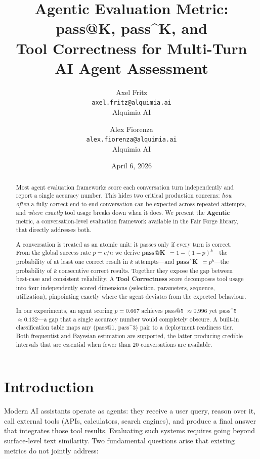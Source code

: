 \documentclass[11pt,a4paper]{article}
\title{\textbf{Agentic Evaluation Metric: pass@K, pass\^{}K, and\\
Tool Correctness for Multi-Turn AI Agent Assessment}}
\author{
    Axel Fritz\\
    \texttt{axel.fritz@alquimia.ai}\\
    Alquimia AI
    \and
    Alex Fiorenza\\
    \texttt{alex.fiorenza@alquimia.ai}\\
    Alquimia AI
}
\date{April 6, 2026}
\begin{document}
\maketitle

\begin{abstract}
Most agent evaluation frameworks score each conversation turn independently
and report a single accuracy number. This hides two critical production
concerns: \emph{how often} a fully correct end-to-end conversation can be
expected across repeated attempts, and \emph{where exactly} tool usage breaks
down when it does. We present the \textbf{Agentic} metric, a
conversation-level evaluation framework available in the Fair Forge library,
that directly addresses both.

A conversation is treated as an atomic unit: it passes only if every turn
is correct. From the global success rate $p = c/n$ we derive
\textbf{pass@K}~$= 1-(1-p)^k$---the probability of at least one correct
result in $k$ attempts---and \textbf{pass\^{}K}~$= p^k$---the probability
of $k$ consecutive correct results. Together they expose the gap between
best-case and consistent reliability. A \textbf{Tool Correctness} score
decomposes tool usage into four independently scored dimensions (selection,
parameters, sequence, utilization), pinpointing exactly where the agent
deviates from the expected behaviour.

In our experiments, an agent scoring $p = 0.667$ achieves pass@5 $\approx
0.996$ yet pass\^{}5 $\approx 0.132$---a gap that a single accuracy number
would completely obscure. A built-in classification table maps any
(pass@1, pass\^{}3) pair to a deployment readiness tier. Both frequentist
and Bayesian estimation are supported, the latter producing credible intervals
that are essential when fewer than 20 conversations are available.
\end{abstract}

\section{Introduction}

Modern AI assistants operate as agents: they receive a user query, reason over
it, call external tools (APIs, calculators, search engines), and produce a
final answer that integrates those tool results. Evaluating such systems
requires going beyond surface-level text similarity. Two fundamental questions
arise that existing metrics do not jointly address:
\end{document}

